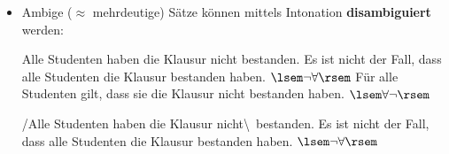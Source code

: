 
\begin{frame}

\begin{itemize}
	\item Ambige ($\approx$ mehrdeutige) Sätze können mittels Intonation  \textbf{disambiguiert} werden: 
	
	  \ea
          Alle Studenten haben die Klausur nicht bestanden.
          \z
        \eal
	\ex Es ist nicht der Fall, dass alle Studenten die Klausur bestanden haben. \hfill $\lsem \neg \forall \rsem$
	\ex Für alle Studenten gilt, dass sie die Klausur nicht bestanden haben. \hfill $\lsem \forall \neg \rsem$
        \zl
\pause 

\ea
/Alle Studenten haben die Klausur  nicht\textbackslash\ bestanden.
\z
\eal
\ex Es ist nicht der Fall, dass alle Studenten die Klausur bestanden haben. \hfill $\lsem \neg \forall \rsem$
	\zl

\end{itemize}

\end{frame}


